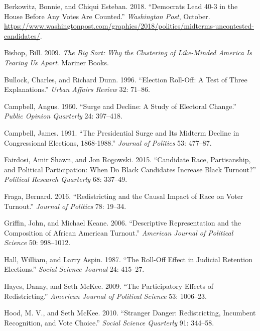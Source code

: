 \documentclass[
  12pt,
]{article}
\newlength{\cslhangindent}
\newenvironment{cslreferences}%
  {\setlength{\parindent}{0pt}%
  \everypar{\setlength{\hangindent}{\cslhangindent}}\ignorespaces}%
  {\par}
\begin{document}
\hypertarget{refs}{}
\begin{cslreferences}
\leavevmode\hypertarget{ref-wapo}{}%
Berkowitz, Bonnie, and Chiqui Esteban. 2018. ``Democrats Lead 40-3 in the House Before Any Votes Are Counted.'' \emph{Washington Post}, October. \url{https://www.washingtonpost.com/graphics/2018/politics/midterms-uncontested-candidates/}.

\leavevmode\hypertarget{ref-Bishop2009}{}%
Bishop, Bill. 2009. \emph{The Big Sort: Why the Clustering of Like-Minded America Is Tearing Us Apart}. Mariner Books.

\leavevmode\hypertarget{ref-Bullock1996}{}%
Bullock, Charles, and Richard Dunn. 1996. ``Election Roll-Off: A Test of Three Explanations.'' \emph{Urban Affairs Review} 32: 71--86.

\leavevmode\hypertarget{ref-Campbell1960}{}%
Campbell, Angus. 1960. ``Surge and Decline: A Study of Electoral Change.'' \emph{Public Opinion Quarterly} 24: 397--418.

\leavevmode\hypertarget{ref-Campbell1991}{}%
Campbell, James. 1991. ``The Presidential Surge and Its Midterm Decline in Congressional Elections, 1868-1988.'' \emph{Journal of Politics} 53: 477--87.

\leavevmode\hypertarget{ref-Fairdosi2015}{}%
Fairdosi, Amir Shawn, and Jon Rogowski. 2015. ``Candidate Race, Partisanship, and Political Participation: When Do Black Candidates Increase Black Turnout?'' \emph{Political Research Quarterly} 68: 337--49.

\leavevmode\hypertarget{ref-Fraga2016}{}%
Fraga, Bernard. 2016. ``Redistricting and the Causal Impact of Race on Voter Turnout.'' \emph{Journal of Politics} 78: 19--34.

\leavevmode\hypertarget{ref-Griffin2006}{}%
Griffin, John, and Michael Keane. 2006. ``Descriptive Representation and the Composition of African American Turnout.'' \emph{American Journal of Political Science} 50: 998--1012.

\leavevmode\hypertarget{ref-Hall1987}{}%
Hall, William, and Larry Aspin. 1987. ``The Roll-Off Effect in Judicial Retention Elections.'' \emph{Social Science Journal} 24: 415--27.

\leavevmode\hypertarget{ref-Hayes2009}{}%
Hayes, Danny, and Seth McKee. 2009. ``The Participatory Effects of Redistricting.'' \emph{American Journal of Political Science} 53: 1006--23.

\leavevmode\hypertarget{ref-Hood2010}{}%
Hood, M. V., and Seth McKee. 2010. ``Stranger Danger: Redistricting, Incumbent Recognition, and Vote Choice.'' \emph{Social Science Quarterly} 91: 344--58.


\end{cslreferences}
\end{document}

